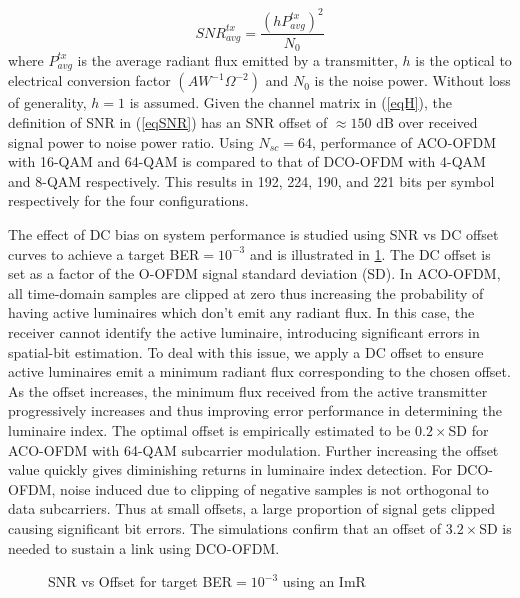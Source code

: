 \documentclass[12pt,letterpaper,onecolumn]{article} %
\begin{document}
\begin{equation}
	\label{eqSNR}
	SNR^{tx}_{avg} = \frac{(hP_{avg}^{tx})^2}{N_{0}}
\end{equation}
where $P_{avg}^{tx}$ is the average radiant flux emitted by a transmitter, $h$ is the optical to electrical conversion factor $(AW^{-1}\Omega^{-2})$ and $N_0$ is the noise power. Without loss of generality, $h=1$ is assumed. Given the channel matrix in (\ref{eqH}), the definition of SNR in (\ref{eqSNR}) has an SNR offset of $\approx 150$ dB over received signal power to noise power ratio. Using $N_{sc}=64$, performance of ACO-OFDM with 16-QAM and 64-QAM is compared to that of DCO-OFDM with 4-QAM and 8-QAM respectively. This results in 192, 224, 190, and 221 bits per symbol respectively for the four configurations.

The effect of DC bias on system performance is studied using SNR vs DC offset curves to achieve a target BER$=10^{-3}$ and is illustrated in \figurename{\ref{fig:SNRvsOfst}}. The DC offset is set as a factor of the O-OFDM signal standard deviation (SD). In ACO-OFDM, all time-domain samples are clipped at zero thus increasing the probability of having active luminaires which don't emit any radiant flux. In this case, the receiver cannot identify the active luminaire, introducing significant errors in spatial-bit estimation. To deal with this issue, we apply a DC offset to ensure active luminaires emit a minimum radiant flux corresponding to the chosen offset. As the offset increases, the minimum flux received from the active transmitter progressively increases and thus improving error performance in determining the luminaire index. The optimal offset is empirically estimated to be $0.2\times$SD for ACO-OFDM with 64-QAM subcarrier modulation. Further increasing the offset value quickly gives diminishing returns in luminaire index detection. For DCO-OFDM, noise induced due to clipping of negative samples is not orthogonal to data subcarriers. Thus at small offsets, a large proportion of signal gets clipped causing significant bit errors. The simulations confirm that an offset of $3.2\times$SD is needed to sustain a link using DCO-OFDM.
\begin{figure}[!t]
\makebox[\textwidth]{\framebox[3.3in]{\rule{0pt}{2.48in}}}
\caption{SNR vs Offset for target BER$= 10^{-3}$ using an ImR}
	\label{fig:SNRvsOfst}
\end{figure}
\end{document}
